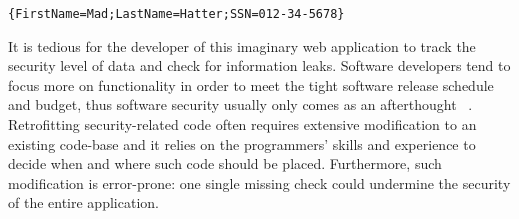 \begin{lstlisting}[numbers=none,xleftmargin=0.1\textwidth]
{FirstName=Mad;LastName=Hatter;SSN=012-34-5678}
\end{lstlisting}

\noindent It is tedious for the developer of this imaginary web application to track the
security level of data and check for information leaks. Software developers tend
to focus more on functionality in order to meet the tight software release
schedule and budget, thus software security usually only comes as an
afterthought
~\parencite{assal2018security,sharma2017aspects,steward2012software}.
Retrofitting security-related code often requires extensive modification to an
existing code-base and it relies on the programmers' skills and experience to
decide when and where such code should be placed. Furthermore, such modification
is error-prone: one single missing check could undermine the security of the
entire application.

\begin{figure*}[tbp]
  \small
  \center
{}
\caption{The parse tree generated from the example user input.
  All terminals are represented as labeled values:
  the {\color{red} red} ones, such as the digits of SSN,
  are of high-security, while the {\color{green} green} ones, such as the keys
  of the record and first name / last name, are of low-security.}
\label{fig:parsetree}
\end{figure*}

